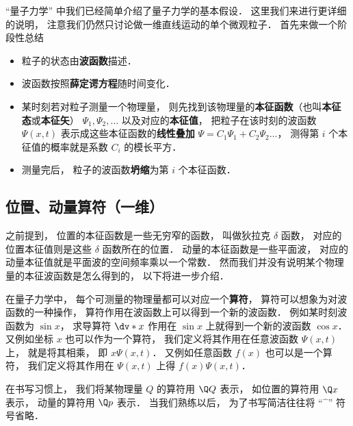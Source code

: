 


“量子力学” 中我们已经简单介绍了量子力学的基本假设． 这里我们来进行更详细的说明， 注意我们仍然只讨论做一维直线运动的单个微观粒子． 首先来做一个阶段性总结
\begin{itemize}
\item 粒子的状态由\textbf{波函数}描述．
\item 波函数按照\textbf{薛定谔方程}随时间变化．
\item 某时刻若对粒子测量一个物理量， 则先找到该物理量的\textbf{本征函数}（也叫\textbf{本征态}或\textbf{本征矢}） $\Psi_1, \Psi_2, \dots$ 以及对应的\textbf{本征值}， 把粒子在该时刻的波函数 $\Psi(x, t)$ 表示成这些本征函数的\textbf{线性叠加} $\Psi = C_1 \Psi_1 + C_2 \Psi_2\dots$， 测得第 $i$ 个本征值的概率就是系数 $C_i$ 的模长平方．
\item 测量完后， 粒子的波函数\textbf{坍缩}为第 $i$ 个本征函数．
\end{itemize}

\subsection{位置、动量算符（一维）}
之前提到， 位置的本征函数是一些无穷窄的函数， 叫做狄拉克 $\delta$ 函数， 对应的位置本征值则是这些 $\delta$ 函数所在的位置． 动量的本征函数是一些平面波， 对应的动量本征值就是平面波的空间频率乘以一个常数． 然而我们并没有说明某个物理量的本征波函数是怎么得到的， 以下将进一步介绍．

在量子力学中， 每个可测量的物理量都可以对应一个\textbf{算符}， 算符可以想象为对波函数的一种操作， 算符作用在波函数上可以得到一个新的波函数． 例如某时刻波函数为 $\sin x$， 求导算符 $\dv*{x}$ 作用在 $\sin x$ 上就得到一个新的波函数 $\cos x$． 又例如坐标 $x$ 也可以作为一个算符， 我们定义将其作用在任意波函数 $\Psi(x, t)$ 上， 就是将其相乘， 即 $x\Psi(x, t)$． 又例如任意函数 $f(x)$ 也可以是一个算符， 我们定义将其作用在 $\Psi(x, t)$ 上得 $f(x)\Psi(x, t)$．

在书写习惯上， 我们将某物理量 $Q$ 的算符用 $\Q Q$ 表示， 如位置的算符用 $\Q x$ 表示， 动量的算符用 $\Q p$ 表示． 当我们熟练以后， 为了书写简洁往往将 “$\hat{\phantom{x}}$” 符号省略．

